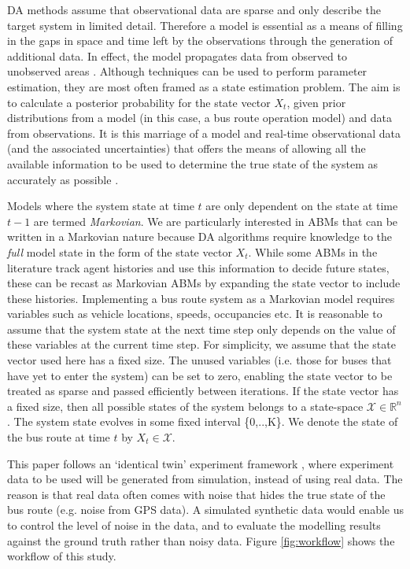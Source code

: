 DA methods assume that observational data are sparse and only describe
the target system in limited detail. Therefore a model is essential as a
means of filling in the gaps in space and time left by the observations through the generation of additional data.
In effect, the model propagates data from observed to unobserved areas
\citep{carrassi_data_2018}.  Although techniques can be used to
perform parameter estimation, they are most often framed as a state
estimation problem. The aim is to calculate a posterior probability for
the state vector $X_t$, given prior distributions from a model (in this
case, a bus route operation model) and data from observations. It is
this marriage of a model and real-time observational data (and the 
associated uncertainties) that offers the means of allowing all the
available information to be used to determine the true state of the
system as accurately as possible \citep{talagrand_use_1991}.

Models where the system state at time $t$ are only dependent on the state at time $t-1$ are termed \textit{Markovian}. We are particularly interested in ABMs that can be written in a Markovian nature because DA algorithms require knowledge to the \textit{full} model state in the form of the state vector $X_t$. While some ABMs in the literature track agent histories and use this information to decide future states, these can be recast as Markovian ABMs by expanding the state vector to include these histories. Implementing a bus route system as a Markovian model requires variables such as vehicle locations, speeds, occupancies etc. It is reasonable to
assume that the system state at the next time step only depends on the
value of these variables at the current time step. For simplicity, we
assume that the state vector used here has a fixed size.  The unused variables (i.e. those for buses that have yet to enter the system) can be set to zero, enabling the state vector to be treated as sparse and
passed efficiently between iterations. If the state vector has a fixed
size, then all possible states of the system belongs to a state-space
$\mathcal{X} \in \mathbb{R}^n$. The system state evolves in some fixed
interval \{0,..,K\}. We denote the state of the bus route at time $t$ by
$X_t \in \mathcal{X}$.

This paper follows an `identical twin' experiment framework \cite{wang_data_2015}, where experiment data to be used will be generated from simulation, instead of using real data. The reason is that real data often comes with noise that hides the true state of the bus route (e.g. noise from GPS data). A simulated synthetic data would enable us to control the level of noise in the data, and to evaluate the modelling results against the ground truth rather than noisy data. Figure \ref{fig:workflow} shows the workflow of this study. 

